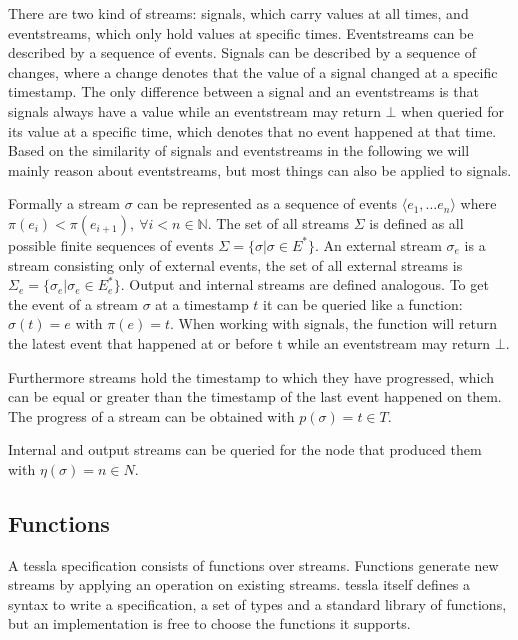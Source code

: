 There are two kind of streams: signals, which carry values at all times, and event\-streams, which only hold values at specific times.
Eventstreams can be described by a sequence of events.
Signals can be described by a sequence of changes, where a change denotes that the value of a signal changed at a specific timestamp.
The only difference between a signal and an eventstreams is that signals always have a value while an eventstream may return \(\bot\) when queried for its value at a specific time, which denotes that no event happened at that time.
Based on the similarity of signals and eventstreams in the following we will mainly reason about eventstreams, but most things can also be applied to signals.

Formally a stream \(\sigma\) can be represented as a sequence of events \(\langle e_1, \dots e_n\rangle\) where \(\pi(e_i) < \pi(e_{i+1}),\ \forall i < n \in \mathbb{N}\).
The set of all streams \(\Sigma\) is defined as all possible finite sequences of events \(\Sigma = \{\sigma | \sigma \in E^* \}\).
An external stream \(\sigma_e\) is a stream consisting only of external events, the set of all external streams is \(\Sigma_e = \{\sigma_e | \sigma_e \in E_e^*\}\).
Output and internal streams are defined analogous.
To get the event of a stream \(\sigma\) at a timestamp \(t\) it can be queried like a function: \(\sigma(t) = e\) with \(\pi(e) = t \).
When working with signals, the function will return the latest event that happened at or before t while an eventstream may return \(\bot\).

Furthermore streams hold the timestamp to which they have progressed, which can be equal or greater than the timestamp of the last event happened on them.
The progress of a stream can be obtained with \(p(\sigma) = t \in T\).

Internal and output streams can be queried for the node that produced them with \(\eta(\sigma) = n \in N\).

\subsection{Functions}
\label{sec:concepts:defs:functions}

A \gls{tessla} specification consists of functions over streams.
Functions generate new streams by applying an operation on existing streams.
\gls{tessla} itself defines a syntax to write a specification, a set of types and a standard library of functions, but an implementation is free to choose the functions it supports.

